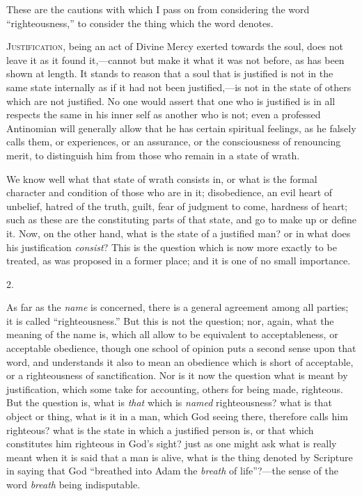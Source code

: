 These are the cautions with which I pass on from considering the
word ``righteousness,'' to consider the thing which the word
denotes.


J\textsc{ustification}, being an act of Divine Mercy exerted towards
the soul, does not leave it as it found it,—cannot but make it what
it was not before, as has been shown at length. It stands to reason
that a soul that is justified is not in the same state internally as
if it had not been justified,—is not in the state of others which
are not justified. No one would assert that one who is justified is in
all respects the same in his inner self as another who is not; even a
professed Antinomian will generally allow that he has certain
spiritual feelings, as he falsely calls them, or experiences, or an
assurance, or the consciousness of renouncing merit, to distinguish
him from those who remain in a state of wrath.

We know well what that state of wrath consists in, or what is the
formal character and condition of those who are in it; disobedience,
an evil heart of unbelief, hatred of the truth, guilt, fear of
judgment to come, hardness of heart; such as these are the
constituting parts of that state, and go to make up or define it. Now,
on the other hand, what is the state of a justified man? or in what
does his justification \emph{consist}? This is the question which is
now more exactly to be treated, as was proposed in a former place; and
it is one of no small importance.

2.

As far as the \emph{name} is concerned, there is a general
agreement among all parties; it is called ``righteousness.''
But this is not the question; nor, again, what the meaning of the name
is, which all allow to be equivalent to acceptableness, or acceptable
obedience, though one school of opinion puts a second sense upon that
word, and understands it also to mean an obedience which is short of
acceptable, or a righteousness of sanctification. Nor is it now the
question what is meant by justification, which some take for
accounting, others for being made, righteous. But the question is,
what is \emph{that} which is \emph{named} righteousness? what is that
object or thing, what is it in a man, which God seeing there,
therefore calls him righteous? what is the state in which a justified
person is, or that which constitutes him righteous in God's sight?
just as one might ask what is really meant when it is said that a man
is alive, what is the thing denoted by Scripture in saying that God
``breathed into Adam the \emph{breath} of life''?—the sense
of the word \emph{breath} being indisputable.


